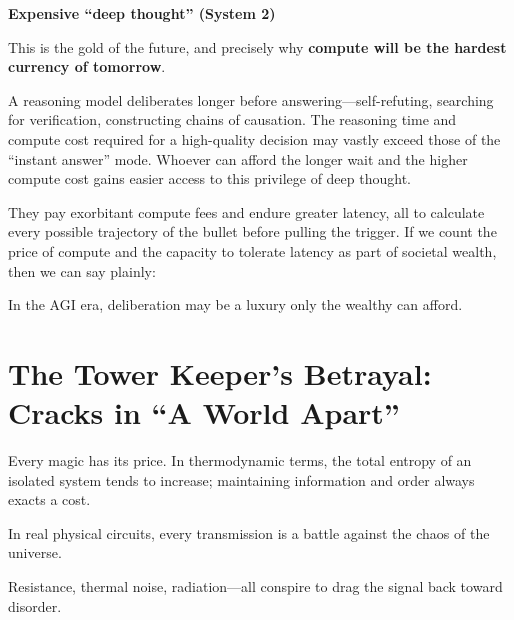 \vspace{1em}

\textbf{Expensive ``deep thought'' (System 2)}

This is the gold of the future, and precisely why \textbf{compute will be the hardest currency of tomorrow}.

A reasoning model deliberates longer before answering---self-refuting, searching for verification, constructing chains of causation. The reasoning time and compute cost required for a high-quality decision may vastly exceed those of the ``instant answer'' mode. Whoever can afford the longer wait and the higher compute cost gains easier access to this privilege of deep thought.

They pay exorbitant compute fees and endure greater latency, all to calculate every possible trajectory of the bullet before pulling the trigger. If we count the price of compute and the capacity to tolerate latency as part of societal wealth, then we can say plainly:

\begin{importantbox}
In the AGI era, deliberation may be a luxury only the wealthy can afford.
\end{importantbox}


\newpage
\section{The Tower Keeper's Betrayal: Cracks in ``A World Apart''}


Every magic has its price. In thermodynamic terms, the total entropy of an isolated system tends to increase; maintaining information and order always exacts a cost.

\vspace{1em}

In real physical circuits, every transmission is a battle against the chaos of the universe.

Resistance, thermal noise, radiation---all conspire to drag the signal back toward disorder.

